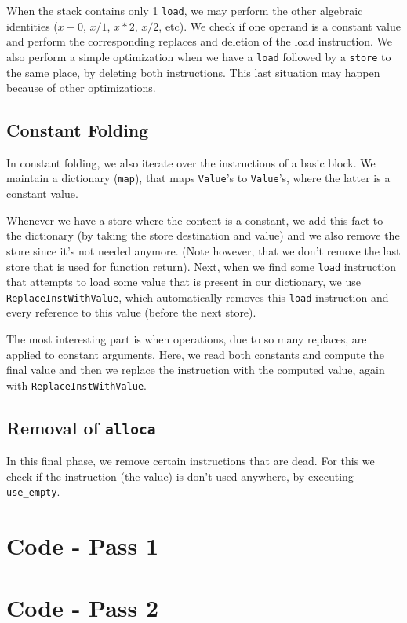 When the stack contains only 1 \texttt{load}, we may perform the other algebraic identities ($x + 0$, $x / 1$, $x * 2$, $x / 2$, etc). We check if one operand is a constant value and perform
the corresponding replaces and deletion of the load instruction. We also perform a simple optimization when we have a \texttt{load} followed by a \texttt{store} to the same place,
    by deleting both instructions. This last situation may happen because of other optimizations.

\subsection{Constant Folding}

In constant folding, we also iterate over the instructions of a basic block. We maintain a dictionary (\texttt{map}), that maps \texttt{Value}'s to \texttt{Value}'s, where the latter is a constant value.

Whenever we have a store where the content is a constant, we add this fact to the dictionary (by taking the store destination and value) and we also remove the store since it's not needed anymore. (Note however, that we don't remove the last store that is used for function return). Next, when we find some \texttt{load} instruction that attempts to load some value that is present in our dictionary, we use
\texttt{ReplaceInstWithValue}, which automatically removes this \texttt{load} instruction and every reference to this value (before the next store).

The most interesting part is when operations, due to so many replaces, are applied to constant arguments. Here, we read both constants and compute the final value and then we replace the instruction with the computed value, again with \texttt{ReplaceInstWithValue}.

\subsection{Removal of \texttt{alloca}}

In this final phase, we remove certain instructions that are dead. For this we check if the instruction (the value) is don't used anywhere, by executing \texttt{use\_empty}.

\section{Code - Pass 1}



\section{Code - Pass 2}




